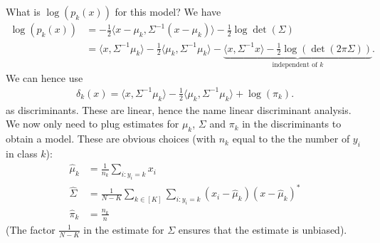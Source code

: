 \documentclass{article}
\newcommand{\sprod}[1]{\langle #1 \rangle}
\begin{document}
What is $\log(p_k(x))$ for this model? We have
\begin{align*}
    \log(p_k(x)) &= - \tfrac{1}{2}\sprod{x-\mu_k,\Sigma^{-1}(x-\mu_k)} - \tfrac{1}{2}\log \det(\Sigma) \\
        &= \sprod{x,\Sigma^{-1}\mu_k} -\tfrac{1}{2}\sprod{\mu_k,\Sigma^{-1}\mu_k}-\underbrace{\sprod{x,\Sigma^{-1}x}- \tfrac{1}{2}\log(\det(2\pi\Sigma))}_{\text{independent of $k$}}.
\end{align*}
We can hence use
\begin{align*}
    \delta_k(x) = \sprod{x,\Sigma^{-1}\mu_k} -\tfrac{1}{2}\sprod{\mu_k,\Sigma^{-1}\mu_k} + \log(\pi_k).
\end{align*}
as discriminants. These are linear, hence the name linear discriminant analysis. We now only need to plug estimates for $\mu_k$, $\Sigma$ and $\pi_k$ in the discriminants to obtain a model. These are obvious choices (with $n_k$ equal to the the number of $y_i$ in class $k$):
\begin{align*}
    \hat{\mu}_k &= \frac{1}{n_k} \sum_{i: y_i =k} x_i \\
    \widehat{\Sigma} &= \frac{1}{N-K}\sum_{k\in [K]} \sum_{i : y_i =k}(x_i-\hat{\mu}_k)(x-\hat{\mu}_k)^* \\
    \hat{\pi}_k &= \frac{n_k}{n}
\end{align*}
(The factor $\tfrac{1}{N-K}$ in the estimate for $\Sigma$ ensures that the estimate is unbiased).
\end{document}
